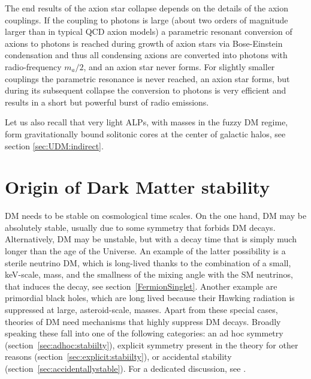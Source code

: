 The end results of the axion star collapse depends on the details of the axion couplings. If the coupling to photons is large (about two orders of magnitude larger than in typical QCD axion models) a parametric resonant conversion of axions to photons is reached during growth of axion stars via Bose-Einstein condensation and thus all condensing axions are converted into photons with radio-frequency  $m_a/2$, and an axion star never forms. 
For slightly smaller couplings the parametric resonance is never reached, an axion star forms, 
but during its subsequent collapse the conversion to photons is very efficient and results in a short but powerful burst of radio emissions. 

\smallskip

Let us also recall that very light ALPs, with masses in the fuzzy DM regime, form gravitationally bound solitonic cores at the center of galactic halos, see section \ref{sec:UDM:indirect}.




\section{Origin of Dark Matter stability}
\label{sec:DMSSB}
DM needs to be stable on cosmological time scales. 
On the one hand, DM may be absolutely stable, usually due to some symmetry that forbids DM decays. 
Alternatively, DM may be unstable, but with a decay time that is simply much longer than the age of the Universe.
An example of the latter possibility is a sterile neutrino DM, which is 
long-lived thanks to the combination of  a small, keV-scale, mass, 
and the smallness of the mixing angle with the SM neutrinos, that induces the decay, 
see section~\ref{FermionSinglet}. Another example are
primordial black holes, which are long lived because their Hawking radiation is suppressed at large, asteroid-scale, masses. 
Apart from these special cases, theories of DM need mechanisms that highly suppress DM decays.
Broadly speaking these fall into one of the following categories: 
an ad hoc symmetry (section~\ref{sec:adhoc:stabiilty}), 
explicit symmetry present in the theory for other reasons (section~\ref{sec:explicit:stabiilty}), 
or accidental stability (section~\ref{sec:accidentallystable}). 
For a dedicated discussion, see \cite{Hambye:2010zb}.

